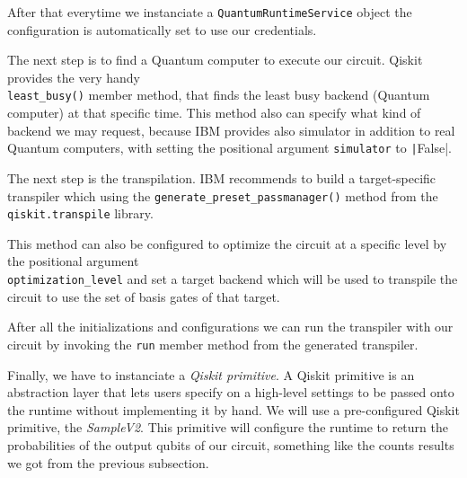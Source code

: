 After that everytime we instanciate a \verb|QuantumRuntimeService| object the configuration
is automatically set to use our credentials.

The next step is to find a Quantum computer to execute our circuit. Qiskit provides the very
handy \\\verb|least_busy()| member method, that finds the least busy backend (Quantum computer)
at that specific time. This method also can specify what kind of backend we may request, because
IBM provides also simulator in addition to real Quantum computers, with setting the positional
argument \verb|simulator| to \texttt|False|.

The next step is the transpilation. IBM recommends to build a target-specific transpiler which
using the \verb|generate_preset_passmanager()| method from the \verb|qiskit.transpile| library.

This method can also be configured to optimize the circuit at a specific level by the
positional argument \\\verb|optimization_level| and set a target backend which will be used
to transpile the circuit to use the set of basis gates of that target.

After all the initializations and configurations we can run the transpiler with our circuit
by invoking the \verb|run| member method from the generated transpiler.

Finally, we have to instanciate a \textit{Qiskit primitive}. A Qiskit primitive is an abstraction
layer that lets users specify on a high-level settings to be passed onto the runtime without
implementing it by hand. We will use a pre-configured Qiskit primitive, the \textit{SampleV2}.
This primitive will configure the runtime to return the probabilities of the output qubits
of our circuit, something like the counts results we got from the previous subsection.

